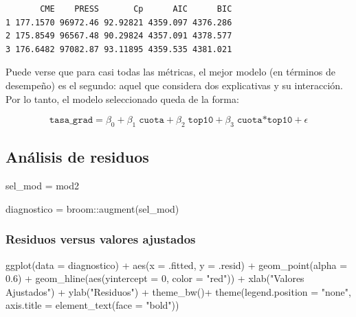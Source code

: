 \documentclass[
  letterpaper,
  DIV=11,
  numbers=noendperiod]{scrartcl}
\newenvironment{Shaded}{\begin{snugshade}}{\end{snugshade}}
\newcommand{\AttributeTok}[1]{\textcolor[rgb]{0.40,0.45,0.13}{#1}}
\newcommand{\DecValTok}[1]{\textcolor[rgb]{0.68,0.00,0.00}{#1}}
\newcommand{\FloatTok}[1]{\textcolor[rgb]{0.68,0.00,0.00}{#1}}
\newcommand{\FunctionTok}[1]{\textcolor[rgb]{0.28,0.35,0.67}{#1}}
\newcommand{\NormalTok}[1]{\textcolor[rgb]{0.00,0.23,0.31}{#1}}
\newcommand{\OtherTok}[1]{\textcolor[rgb]{0.00,0.23,0.31}{#1}}
\newcommand{\SpecialCharTok}[1]{\textcolor[rgb]{0.37,0.37,0.37}{#1}}
\newcommand{\StringTok}[1]{\textcolor[rgb]{0.13,0.47,0.30}{#1}}
\begin{document}
\begin{verbatim}
       CME    PRESS       Cp      AIC      BIC
1 177.1570 96972.46 92.92821 4359.097 4376.286
2 175.8549 96567.48 90.29824 4357.091 4378.577
3 176.6482 97082.87 93.11895 4359.535 4381.021
\end{verbatim}

Puede verse que para casi todas las métricas, el mejor modelo (en
términos de desempeño) es el segundo: aquel que considera dos
explicativas y su interacción. Por lo tanto, el modelo seleccionado
queda de la forma:

\[
\texttt{tasa_grad} = \beta_0 + \beta_1 \;\texttt{cuota} + \beta_2 \;\texttt{top10} + \beta_3 \;\texttt{cuota*top10} + \epsilon
\]

\hypertarget{anuxe1lisis-de-residuos}{%
\subsection{Análisis de residuos}\label{anuxe1lisis-de-residuos}}

\begin{Shaded}
\begin{Highlighting}[]
\NormalTok{sel\_mod }\OtherTok{=}\NormalTok{ mod2}

\NormalTok{diagnostico }\OtherTok{=}\NormalTok{ broom}\SpecialCharTok{::}\FunctionTok{augment}\NormalTok{(sel\_mod)}
\end{Highlighting}
\end{Shaded}

\hypertarget{residuos-versus-valores-ajustados}{%
\subsubsection{Residuos versus valores
ajustados}\label{residuos-versus-valores-ajustados}}

\begin{Shaded}
\begin{Highlighting}[]
\FunctionTok{ggplot}\NormalTok{(}\AttributeTok{data =}\NormalTok{ diagnostico) }\SpecialCharTok{+} 
    \FunctionTok{aes}\NormalTok{(}\AttributeTok{x =}\NormalTok{ .fitted, }\AttributeTok{y =}\NormalTok{ .resid) }\SpecialCharTok{+} 
    \FunctionTok{geom\_point}\NormalTok{(}\AttributeTok{alpha =} \FloatTok{0.6}\NormalTok{) }\SpecialCharTok{+}
    \FunctionTok{geom\_hline}\NormalTok{(}\FunctionTok{aes}\NormalTok{(}\AttributeTok{yintercept =} \DecValTok{0}\NormalTok{, }\AttributeTok{color =} \StringTok{"red"}\NormalTok{)) }\SpecialCharTok{+}
    \FunctionTok{xlab}\NormalTok{(}\StringTok{"Valores Ajustados"}\NormalTok{) }\SpecialCharTok{+}
    \FunctionTok{ylab}\NormalTok{(}\StringTok{"Residuos"}\NormalTok{) }\SpecialCharTok{+}
    \FunctionTok{theme\_bw}\NormalTok{()}\SpecialCharTok{+}
    \FunctionTok{theme}\NormalTok{(}\AttributeTok{legend.position =} \StringTok{"none"}\NormalTok{,}
      \AttributeTok{axis.title =} \FunctionTok{element\_text}\NormalTok{(}\AttributeTok{face =} \StringTok{"bold"}\NormalTok{))}
\end{Highlighting}
\end{Shaded}
\end{document}
